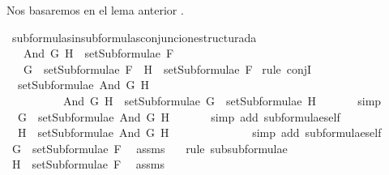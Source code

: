 \begin{isabellebody}
\begin{isamarkuptext}
  Nos basaremos en el lema anterior .%
\end{isamarkuptext}\isamarkuptrue%
\isamarkupfalse%
\ subformulas{\isacharunderscore}in{\isacharunderscore}subformulas{\isacharunderscore}conjuncion{\isacharunderscore}estructurada{\isacharcolon}\isanewline
\ \ \ {\isachardoublequoteopen}And\ G\ H\ {\isasymin}\ setSubformulae\ F{\isachardoublequoteclose}\ \isanewline
\ \ \ {\isachardoublequoteopen}G\ {\isasymin}\ setSubformulae\ F\ {\isasymand}\ H\ {\isasymin}\ setSubformulae\ F{\isachardoublequoteclose}\isanewline
%
\isadelimproof
%
\endisadelimproof
%
\isatagproof
{}\isamarkupfalse%
\ {\isacharparenleft}rule\ conjI{\isacharparenright}\isanewline
\ \ \isamarkupfalse%
\ {}{\isacharcolon}\ {\isachardoublequoteopen}setSubformulae\ {\isacharparenleft}And\ G\ H{\isacharparenright}\ {\isacharequal}\ \isanewline
\ \ \ \ \ \ \ \ \ \ {\isacharbraceleft}And\ G\ H{\isacharbraceright}\ {\isasymunion}\ setSubformulae\ G\ {\isasymunion}\ setSubformulae\ H{\isachardoublequoteclose}\ \isanewline
\ \ \ \ \isamarkupfalse%
\ simp\ %
\isanewline
\ \ \isamarkupfalse%
\ \isamarkupfalse%
\ {}{\isacharcolon}\ {\isachardoublequoteopen}G\ {\isasymin}\ setSubformulae\ {\isacharparenleft}And\ G\ H{\isacharparenright}{\isachardoublequoteclose}\ \isanewline
\ \ \ \ \isamarkupfalse%
\ {\isacharparenleft}simp\ add{\isacharcolon}\ subformulae{\isacharunderscore}self{\isacharparenright}\ \isanewline
\ \ \isamarkupfalse%
\ {}{\isacharcolon}\ {\isachardoublequoteopen}H\ {\isasymin}\ setSubformulae\ {\isacharparenleft}And\ G\ H{\isacharparenright}{\isachardoublequoteclose}\ \isanewline
\ \ \ \ \isamarkupfalse%
\ {}\ \isanewline
\ \ \ \ \isamarkupfalse%
\ {\isacharparenleft}simp\ add{\isacharcolon}\ subformulae{\isacharunderscore}self{\isacharparenright}\ %
\ \isanewline
\ \ \isamarkupfalse%
\ {\isachardoublequoteopen}G\ {\isasymin}\ setSubformulae\ F{\isachardoublequoteclose}\ \isamarkupfalse%
\ assms\ {}\ \isamarkupfalse%
\ {\isacharparenleft}rule\ subsubformulae{\isacharparenright}\isanewline
\ \ \isamarkupfalse%
\ {\isachardoublequoteopen}H\ {\isasymin}\ setSubformulae\ F{\isachardoublequoteclose}\ \isamarkupfalse%
\ assms\ {}\ \isamarkupfalse%

\end{isabellebody}
